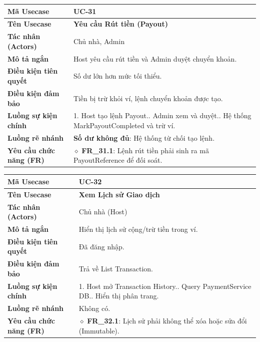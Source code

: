\begin{table}[H]
\renewcommand{\arraystretch}{1.3}
\centering
\begin{tabularx}{\textwidth}{|p{4.5cm}|X|}
\hline
\cellcolor{gray!15}\bfseries Mã Usecase & \textbf{UC-31} \\ \hline
\cellcolor{gray!15}\bfseries Tên Usecase & \textbf{Yêu cầu Rút tiền (Payout)} \\ \hline
\cellcolor{gray!15}\bfseries Tác nhân (Actors) & Chủ nhà, Admin \\ \hline
\cellcolor{gray!15}\bfseries Mô tả ngắn & Host yêu cầu rút tiền và Admin duyệt chuyển khoản. \\ \hline
\cellcolor{gray!15}\bfseries Điều kiện tiên quyết & Số dư lớn hơn mức tối thiểu. \\ \hline
\cellcolor{gray!15}\bfseries Điều kiện đảm bảo & Tiền bị trừ khỏi ví, lệnh chuyển khoản được tạo. \\ \hline
\cellcolor{gray!15}\bfseries Luồng sự kiện chính & 1. Host tạo lệnh Payout.\newline 2. Admin xem và duyệt.\newline 3. Hệ thống MarkPayoutCompleted và trừ ví. \\ \hline
\cellcolor{gray!15}\bfseries Luồng rẽ nhánh & \textbf{Số dư không đủ}: Hệ thống từ chối tạo lệnh. \\ \hline
\cellcolor{gray!15}\bfseries Yêu cầu chức năng (FR) & $\diamond$ \textbf{FR\_31.1}: Lệnh rút tiền phải sinh ra mã PayoutReference để đối soát. \\ \hline
\end{tabularx}
\end{table}

\begin{table}[H]
\renewcommand{\arraystretch}{1.3}
\centering
\begin{tabularx}{\textwidth}{|p{4.5cm}|X|}
\hline
\cellcolor{gray!15}\bfseries Mã Usecase & \textbf{UC-32} \\ \hline
\cellcolor{gray!15}\bfseries Tên Usecase & \textbf{Xem Lịch sử Giao dịch} \\ \hline
\cellcolor{gray!15}\bfseries Tác nhân (Actors) & Chủ nhà (Host) \\ \hline
\cellcolor{gray!15}\bfseries Mô tả ngắn & Hiển thị lịch sử cộng/trừ tiền trong ví. \\ \hline
\cellcolor{gray!15}\bfseries Điều kiện tiên quyết & Đã đăng nhập. \\ \hline
\cellcolor{gray!15}\bfseries Điều kiện đảm bảo & Trả về List Transaction. \\ \hline
\cellcolor{gray!15}\bfseries Luồng sự kiện chính & 1. Host mở Transaction History.\newline 2. Query PaymentService DB.\newline 3. Hiển thị phân trang. \\ \hline
\cellcolor{gray!15}\bfseries Luồng rẽ nhánh & Không có. \\ \hline
\cellcolor{gray!15}\bfseries Yêu cầu chức năng (FR) & $\diamond$ \textbf{FR\_32.1}: Lịch sử phải không thể xóa hoặc sửa đổi (Immutable). \\ \hline
\end{tabularx}
\end{table}

